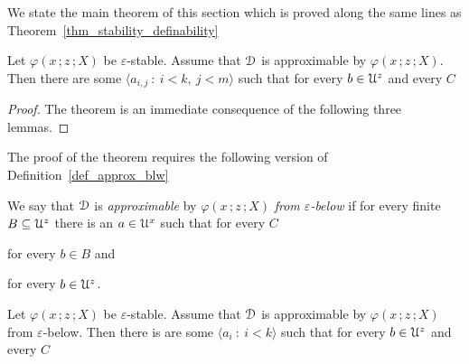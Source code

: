 
We state the main theorem of this section which is proved along the same lines as Theorem~\ref{thm_stability_definability}

\begin{theorem}\label{thm_epsilon_stability_definability}
  Let $\varphi(x\,;z\,;X)$ be $\varepsilon$-stable.
  Assume that ${\EuScript D}$ is approximable by $\varphi(x\,;z\,;X)$.
  Then there are some $\langle a_{i,j}\ :\ i< k,\ j<m\rangle$ such that for every $b\in{\EuScript U}^z$ and every $C$\medskip

  \medskip

\end{theorem}

\begin{proof}
  The theorem is an immediate consequence of the following three lemmas.
\end{proof}


The proof of the theorem requires the following version of Definition~\ref{def_approx_blw}

\begin{definition}\label{def_e_approx_blw}\strut
  We say that ${\EuScript D}$ is \emph{approximable\/} by $\varphi(x\,;z\,;X)$ \emph{from $\varepsilon$-below\/} if for every finite $B\subseteq{\EuScript U}^z$ there is an $a\in{\EuScript U}^x$ such that for every $C$\smallskip

  \hfill for every $b\in B$ and\smallskip

  \hfill for every $b\in{\EuScript U}^z$.\smallskip
\end{definition}


\begin{lemma}
  Let $\varphi(x\,;z\,;X)$ be $\varepsilon$-stable.
  Assume that ${\EuScript D}$ is approximable by $\varphi(x\,;z\,;X)$ from $\varepsilon$-below.
  Then there is are some $\langle a_i\ :\ i<k\rangle$ such that for every $b\in{\EuScript U}^z$ and every $C$\medskip

  \medskip 

\end{lemma}

